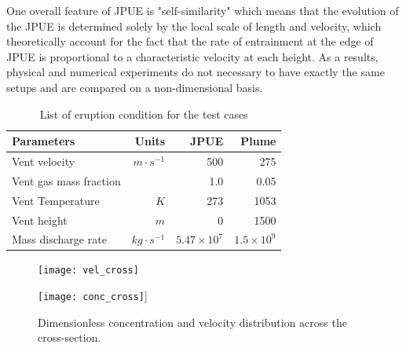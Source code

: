 \documentclass[gmd, manuscript]{copernicus}
\begin{document}
One overall feature of JPUE is "self-similarity" which means that the evolution of the JPUE is determined solely by the local scale of length and velocity, which theoretically account for the fact that the rate of entrainment at the edge of JPUE is proportional to a characteristic velocity at each height. As a results, physical and numerical experiments do not necessary to have exactly the same setups and are compared on a non-dimensional basis.

\begin{table}[htp]
	\begin{centering}
      \caption{List of eruption condition for the test cases}		
	  \begin{tabular}{lrrr}
	    \hline
	    Parameters & Units  & JPUE & Plume \\
	    \hline
	    Vent velocity          & $m\cdot s^{-1}$  & 500               & 275 \\
	    Vent gas mass fraction &                  & 1.0               & 0.05 \\
	    Vent Temperature       & $K$              & 273               & 1053 \\
	    Vent height            & $m$              & 0                 & 1500 \\
	    Mass discharge rate    & $kg\cdot s^{-1}$ & $5.47 \times 10^7$ & $1.5 \times 10^9$\\
	    \hline
	  \end{tabular}
	  \label{tab:input_parameters}
	\end{centering}
\end{table}

\begin{figure}[!htb]
    \centering
    \begin{minipage}{.425\textwidth}
        \centering
        \texttt{[image: vel\_cross]}
    \end{minipage}%
    \begin{minipage}{.425 \textwidth}
        \centering
        \texttt{[image: conc\_cross]}]
    \end{minipage}%
    \caption{Dimensionless concentration and velocity distribution across the cross-section.}
    \label{fig:JPUE_cross-section}
\end{figure}
\end{document}
